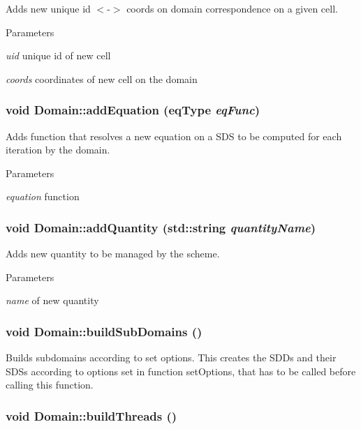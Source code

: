 Adds new unique id $<$-\/$>$ coords on domain correspondence on a given cell. 
\begin{DoxyParams}{Parameters}
\item[{\em uid}]unique id of new cell \item[{\em coords}]coordinates of new cell on the domain \end{DoxyParams}
\hypertarget{classDomain_ab24a61d835dbebec7ff689ec8c7f2a95}{
\subsubsection[{addEquation}]{\setlength{\rightskip}{0pt plus 5cm}void Domain::addEquation (eqType {\em eqFunc})}}
\label{classDomain_ab24a61d835dbebec7ff689ec8c7f2a95}


Adds function that resolves a new equation on a SDS to be computed for each iteration by the domain. 
\begin{DoxyParams}{Parameters}
\item[{\em equation}]function \end{DoxyParams}
\hypertarget{classDomain_a9c33ac08523c95967ad2a51c59fd8d96}{
\subsubsection[{addQuantity}]{\setlength{\rightskip}{0pt plus 5cm}void Domain::addQuantity (std::string {\em quantityName})}}
\label{classDomain_a9c33ac08523c95967ad2a51c59fd8d96}


Adds new quantity to be managed by the scheme. 
\begin{DoxyParams}{Parameters}
\item[{\em name}]of new quantity \end{DoxyParams}
\hypertarget{classDomain_a29537b651bacd922cae449357969d900}{
\subsubsection[{buildSubDomains}]{\setlength{\rightskip}{0pt plus 5cm}void Domain::buildSubDomains ()}}
\label{classDomain_a29537b651bacd922cae449357969d900}


Builds subdomains according to set options. This creates the SDDs and their SDSs according to options set in function setOptions, that has to be called before calling this function. \hypertarget{classDomain_aa2e6cebf44a57323f3c6344d131126c1}{
\subsubsection[{buildThreads}]{\setlength{\rightskip}{0pt plus 5cm}void Domain::buildThreads ()}}
\label{classDomain_aa2e6cebf44a57323f3c6344d131126c1}


